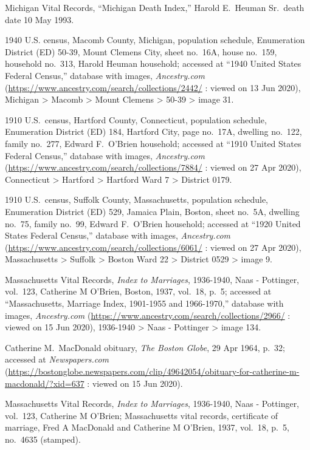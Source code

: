 \begin{thebibliography}{999}
Michigan Vital Records, ``Michigan Death Index,'' Harold E.\ Heuman Sr.\, death date 10 May 1993.

1940 U.S. census, Macomb County, Michigan, population schedule, Enumeration District (ED) 50-39, Mount Clemens City, sheet no.\ 16A, house no.\ 159, household no.\ 313, Harold Heuman household; accessed at ``1940 United States Federal Census,'' database with images, \textit{Ancestry.com} (\url{https://www.ancestry.com/search/collections/2442/} : viewed on 13 Jun 2020), Michigan > Macomb > Mount Clemens > 50-39 > image 31.


1910 U.S.\ census, Hartford County, Connecticut, population schedule, Enumeration District (ED) 184, Hartford City, page no.\ 17A, dwelling no.\ 122, family no.\ 277, Edward F.\ O'Brien household; accessed at ``1910 United States Federal Census,'' database with images, \textit{Ancestry.com} (\url{https://www.ancestry.com/search/collections/7884/} : viewed on 27 Apr 2020), Connecticut > Hartford > Hartford Ward 7 > District 0179.

1910 U.S.\ census, Suffolk County, Massachusetts, population schedule, Enumeration District (ED) 529, Jamaica Plain, Boston, sheet no.\ 5A, dwelling no.\ 75, family no.\ 99, Edward F.\ O'Brien household; accessed at ``1920 United States Federal Census,'' database with images, \textit{Ancestry.com} (\url{https://www.ancestry.com/search/collections/6061/} : viewed on 27 Apr 2020), Massachusetts > Suffolk > Boston Ward 22 > District 0529 > image 9.

Massachusetts Vital Records, \textit{Index to Marriages}, 1936-1940, Naas - Pottinger, vol.\ 123, Catherine M O'Brien, Boston, 1937, vol.\ 18, p.\ 5; accessed at ``Massachusetts, Marriage Index, 1901-1955 and 1966-1970,'' database with images, \textit{Ancestry.com} (\url{https://www.ancestry.com/search/collections/2966/} : viewed on 15 Jun 2020), 1936-1940 > Naas - Pottinger > image 134.

Catherine M.\ MacDonald obituary, \textit{The Boston Globe}, 29 Apr 1964, p.\ 32; accessed at \textit{Newspapers.com} (\url{https://bostonglobe.newspapers.com/clip/49642054/obituary-for-catherine-m-macdonald/?xid=637} : viewed on 15 Jun 2020).

Massachusetts Vital Records, \textit{Index to Marriages}, 1936-1940, Naas - Pottinger, vol.\ 123, Catherine M O'Brien; Massachusetts vital records, certificate of marriage, Fred A MacDonald and Catherine M O'Brien, 1937, vol.\ 18, p.\ 5, no.\ 4635 (stamped).


\end{thebibliography}
